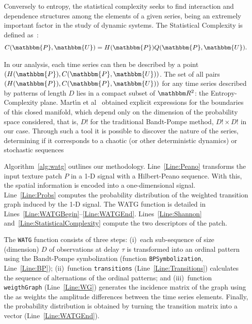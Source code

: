 \documentclass[journal]{IEEEtran}
\begin{document}
	Conversely to entropy, the statistical complexity seeks to find interaction and dependence structures among the elements of a given series, being an extremely important factor in the study of dynamic systems.
	The Statistical Complexity is defined as~\cite{Lamberti2004Entropic}:
	\begin{equation}
	C(\mathbbm{P}, \mathbbm{U}) = H(\mathbbm{P}) Q(\mathbbm{P}, \mathbbm{U}).
	\end{equation}
	
	In our analysis, each time series can then be described by a point $(H(\mathbbm{P}), C(\mathbbm{P}, \mathbbm{U}))$.
	The set of all pairs $(H(\mathbbm{P}), C(\mathbbm{P}, \mathbbm{U}))$ for any time series described by patterns of length $D$ lies in a compact subset of $\mathbbm R^2$: the Entropy-Complexity plane.
	Mart\'{\i}n et al~\cite{martin2006generalized} obtained explicit expressions for the boundaries of this closed manifold, which depend only on the dimension of the probability space considered, that is, $D!$ for the traditional Bandt-Pompe method,
	$D! \times D!$ in our case.
	Through such a tool it is possible to discover the nature of the series, determining if it corresponds to a chaotic (or other deterministic dynamics) or stochastic sequences
	
	Algorithm~\ref{alg:watg} outlines our methodology.
	Line~\ref{Line:Peano} transforms the input texture patch $P$ in a \mbox{1-D} signal with a Hilbert-Peano sequence.
	With this, the spatial information is encoded into a one-dimensional signal.
	Line~\ref{Line:Probs} computes 
	the probability distribution of the weighted transition graph induced by the \mbox{1-D} signal.
	The WATG function is detailed in Lines~\ref{Line:WATGBegin}--\ref{Line:WATGEnd}.
	Lines~\ref{Line:Shannon} and~\ref{Line:StatisticalComplexity} compute the two descriptors of the patch.
	
	The \texttt{WATG} function consists of three steps: 
	(i)~each sub-sequence of size (dimension) $D$ of observations at delay $\tau$ is transformed into an ordinal pattern using the Bandt-Pompe symbolization (function \texttt{BPSymbolization}, Line~\ref{Line:BP}); 
	(ii)~function \texttt{transitions} (Line~\ref{Line:Transitions}) calculates the sequence of alternations of the ordinal patterns; and 
	(iii)~function \texttt{weigthGraph} (Line~\ref{Line:WG}) generates the incidence matrix of the graph using the as weights the amplitude differences between the time series elements.
	Finally, the probability distribution is obtained by turning the transition matrix into a vector (Line~\ref{Line:WATGEnd}).
	
\end{document}
